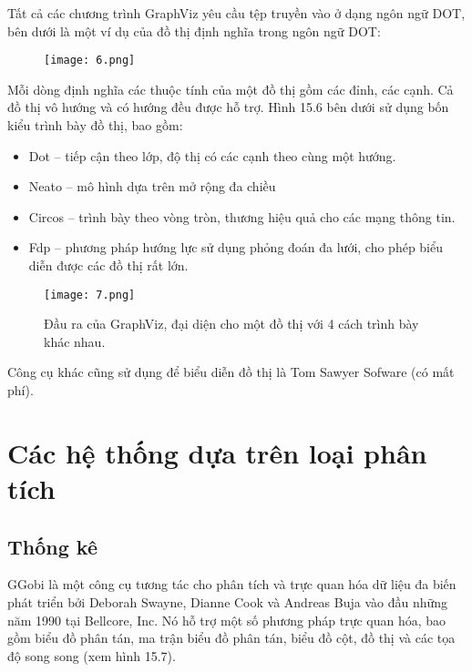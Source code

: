 \documentclass[13pt]{scrartcl} %
\begin{document}
Tất cả các chương trình GraphViz yêu cầu tệp truyền vào ở dạng ngôn ngữ DOT, bên dưới là một ví dụ của đồ thị định nghĩa trong ngôn ngữ DOT:

\begin{figure}[!ht] %
    \centering
    \texttt{[image: 6.png]}
\end{figure}

Mỗi dòng định nghĩa các thuộc tính của một đồ thị gồm các đỉnh, các cạnh. Cả đồ thị vô hướng và có hướng đều được hỗ trợ. Hình 15.6 bên dưới sử dụng bốn kiểu trình bày đồ thị, bao gồm:
\begin{itemize}
    \item Dot – tiếp cận theo lớp, độ thị có các cạnh theo cùng một hướng.
    \item Neato – mô hình dựa trên mở rộng đa chiều
    \item Circos – trình bày theo vòng tròn, thương hiệu quả cho các mạng thông tin.
    \item Fdp – phương pháp hướng lực sử dụng phỏng đoán đa lưới, cho phép biểu diễn được các đồ thị rất lớn.
\end{itemize}

\begin{figure}[!ht] %
    \centering
    \texttt{[image: 7.png]}
    \caption{Đầu ra của GraphViz, đại diện cho một đồ thị với 4 cách trình bày khác nhau.}
\end{figure}

Công cụ khác cũng sử dụng để biểu diễn đồ thị là Tom Sawyer Sofware (có mất phí).


\section{Các hệ thống dựa trên loại phân tích}
\subsection{Thống kê}
GGobi là một công cụ tương tác cho phân tích và trực quan hóa dữ liệu đa biến phát triển bởi Deborah Swayne, Dianne Cook và Andreas Buja vào đầu những năm 1990 tại Bellcore, Inc. Nó hỗ trợ một số phương pháp trực quan hóa, bao gồm biểu đồ phân tán, ma trận biểu đồ phân tán, biểu đồ cột, đồ thị và các tọa độ song song (xem hình 15.7).
\end{document}
